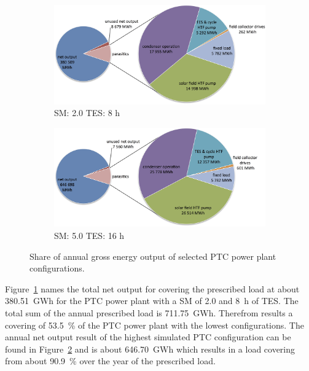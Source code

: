 \begin{figure}[!thbp]
        \centering   
        \begin{subfigure}[b]{0.65\textwidth}
                \centering
                \includegraphics[width=1\textwidth]{FIG/PTC_parasitics_low}
                \caption{SM: 2.0 TES: 8 h}\label{PTC_parasitics_low}
        \end{subfigure}
\par\medskip %
        \begin{subfigure}[b]{0.65\textwidth}
                \centering
                \includegraphics[width=1\textwidth]{FIG/PTC_parasitics_high}
                \caption{SM: 5.0 TES: 16 h}\label{PTC_parasitics_high}
        \end{subfigure}
        \caption[Share of annual gross energy output of selected PTC power plant configurations.]{Share of annual gross energy output of selected PTC power plant configurations.}\label{PTC_parasitics}
\end{figure}
Figure~\ref{PTC_parasitics_low} names the total net output for covering the prescribed load at about \SI{380.51}{GWh} for the PTC power plant with a SM of 2.0 and \SI{8}{h} of TES. The total sum of the annual prescribed load is \SI{711.75}{GWh}. Therefrom results a covering of 53.5~\% of the PTC power plant with the lowest configurations. The annual net output result of the highest simulated PTC configuration can be found in Figure~\ref{PTC_parasitics_high} and is about \SI{646.70}{GWh} which results in a load covering from about 90.9~\% over the year of the prescribed load. 

